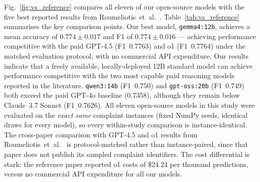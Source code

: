 \documentclass[10pt,a4paper,twocolumn]{article}
\begin{document}
Fig.~\ref{fig:vs_reference} compares all eleven of our open-source
models with the five best reported results from Roumeliotis~et~al.\
\cite{roumeliotis2025think}. Table~\ref{tab:vs_reference} summarises
the key comparison points. Our best model, \texttt{gemma4:12b},
achieves a mean accuracy of $0.774 \pm 0.017$ and F1 of $0.774 \pm 0.016$
--- achieving performance competitive with the paid GPT-4.5 (F1~0.7763)
and o1 (F1~0.7764) under the matched evaluation protocol, with no
commercial API expenditure. Our results indicate that a freely
available, locally-deployed 12B standard model can achieve performance
competitive with the two most capable paid reasoning models reported
in the literature.
\texttt{qwen3:14b} (F1~$0.750$) and \texttt{gpt-oss:20b} (F1~$0.749$)
both exceed the paid GPT-4o baseline (0.7358), although they remain
below Claude~3.7 Sonnet (F1~0.7626).
All eleven open-source models in this study were evaluated on the
\emph{exact same} complaint instances (fixed NumPy seeds, identical
draws for every model), so every within-study comparison is
instance-identical. The cross-paper comparison with GPT-4.5 and o1
results from Roumeliotis~et~al.\ \cite{roumeliotis2025think} is
protocol-matched rather than instance-paired, since that paper does
not publish its sampled complaint identifiers.
The cost differential is stark: the reference paper reported
o1 costs of \$24.24 per thousand predictions, versus no commercial
API expenditure for all our models.
\end{document}
